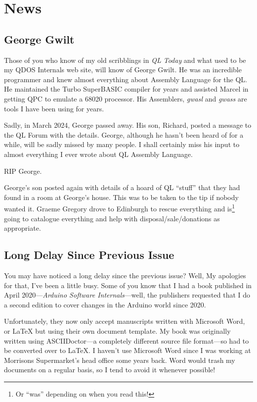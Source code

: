 
\chapter{News}



\section{George Gwilt}

Those of you who know of my old scribblings in \emph{QL Today} and what used to be my QDOS Internals web site, will know of George Gwilt. He was an incredible programmer and knew almost everything about Assembly Language for the QL. He maintained the Turbo SuperBASIC compiler for years and assisted Marcel in getting QPC to emulate a 68020 processor. His Assemblers, \emph{gwasl} and \emph{gwass} are tools I have been using for years.

Sadly, in March 2024, George passed away. His son, Richard, posted a message to the QL Forum with the details. George, although he hasn't been heard of for a while, will be sadly missed by many people. I shall certainly miss his input to almost everything I ever wrote about QL Assembly Language.

RIP George.

George's son posted again with details of a hoard of QL ``stuff'' that they had found in a room at George's house. This was to be taken to the tip if nobody wanted it. Graeme Gregory drove to Edinburgh to rescue everything and is\footnote{Or ``was'' depending on when you read this!} going to catalogue everything and help with disposal/sale/donations as appropriate.

\section{Long Delay Since Previous Issue}

You may have noticed a long delay since the previous issue? Well, My apologies for that, I've been a little busy. Some of you know that I had a book published in April 2020---\emph{Arduino Software Internals}---well, the publishers requested that I do a second edition to cover changes in the Arduino world since 2020.

Unfortunately, they now only accept manuscripts written with Microsoft Word, or \LaTeX{} but using their own document template. My book was originally written using ASCIIDoctor---a completely different source file format---so had to be converted over to \LaTeX{}. I haven't use Microsoft Word since I was working at Morrisons Supermarket's head office some years back. Word would trash my documents on a regular basis, so I tend to avoid it whenever possible!

